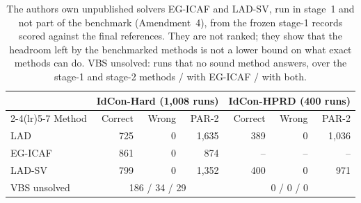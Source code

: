 \begin{table}[t]
\caption{The authors\textquotesingle{} own unpublished solvers EG-ICAF and LAD-SV, run in stage~1 and not part of the benchmark (Amendment~4), from the frozen stage-1 records scored against the final references. They are not ranked; they show that the headroom left by the benchmarked methods is not a lower bound on what exact methods can do. VBS unsolved: runs that no sound method answers, over the stage-1 and stage-2 methods / with EG-ICAF / with both.}
\label{tab:legacy}
\centering\footnotesize
\setlength{\tabcolsep}{3pt}
\begin{tabular}{lrrr rrr}
\toprule
 & \multicolumn{3}{c}{IdCon-Hard (1,008 runs)} & \multicolumn{3}{c}{IdCon-HPRD (400 runs)}\\
\cmidrule(lr){2-4}\cmidrule(lr){5-7}
Method & Correct & Wrong & PAR-2 & Correct & Wrong & PAR-2\\
\midrule
LAD & 725 & 0 & 1,635 & 389 & 0 & 1,036\\
EG-ICAF & 861 & 0 & 874 & -- & -- & --\\
LAD-SV & 799 & 0 & 1,352 & 400 & 0 & 971\\
\midrule
VBS unsolved & \multicolumn{3}{c}{186 / 34 / 29} & \multicolumn{3}{c}{0 / 0 / 0}\\
\bottomrule
\end{tabular}
\end{table}

